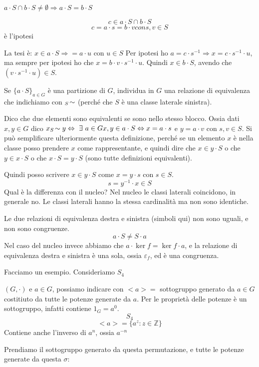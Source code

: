 $a \cdot S \cap b \cdot S \neq \emptyset \Rightarrow a \cdot S = b \cdot S$

\[
c \in a \cdot S \cap b \cdot S
\]
\[
c = a \cdot s = b \cdot v con s, v \in S
\]
\`e l'ipotesi

La tesi \`e:
$x \in a \cdot S \Rightarrow = a \cdot u$ con $u \in S$
Per ipotesi ho $a = c \cdot s^{-1} \Rightarrow x = c \cdot s^{-1} \cdot u$, ma sempre per ipotesi ho che $x = b \cdot v \cdot s^{-1} \cdot u$. Quindi $x \in b \cdot S$, avendo che $(v \cdot s^{-1} \cdot u) \in S$.

Se $\{a \cdot S\}_{a \in G}$ \`e una partizione di $G$, individua in $G$ una relazione di equivalenza che indichiamo con ${}_{S}\!\sim$ (perch\'e che $S$ \`e una classe laterale sinistra).

Dico che due elementi sono equivalenti se sono nello stesso blocco. Ossia dati $x, y \in G$ dico $x \lateralsx{S} y \Leftrightarrow \exists a \in G x, y \in a \cdot S \Leftrightarrow x = a \cdot s$ e $y = a \cdot v$ con $s, v \in S$. Si pu\`o semplificare ulteriormente questa definizione, perch\'e se un elemento $x$ \`e nella classe posso prendere $x$ come rappresentante, e quindi dire che $x \in y \cdot S$ o che $y \in x \cdot S$ o che $x \cdot S = y \cdot S$ (sono tutte definizioni equivalenti).

Quindi posso scrivere $x \in y \cdot S$ come $x = y \cdot s$ con $s \in S$.
\[
s = y^{-1} \cdot x \in S
\]
Qual \`e la differenza con il nucleo? Nel nucleo le classi laterali coincidono, in generale no. Le classi laterali hanno la stessa cardinalit\`a ma non sono identiche.

Le due relazioni di equivalenza destra e sinistra (simboli qui) non sono uguali, e non sono congruenze.
\[
a \cdot S \neq S \cdot a
\]
Nel caso del nucleo invece abbiamo che $a \cdot \ker f = \ker f \cdot a$, e la relazione di equivalenza destra e sinistra \`e una sola, ossia $\varepsilon_f$, ed \`e una congruenza.

Facciamo un esempio. Consideriamo $S_4$

$(G, \cdot)$ e $a \in G$, possiamo indicare con $< a > =$ sottogruppo generato da $a \in G$ costitiuto da tutte le potenze generate da $a$. Per le propriet\`a delle potenze \`e un sottogruppo, infatti contiene $1_G = a^{0}$.
\[
S_4
\]
\[
< a > = \{ a^{z} : z \in \mathbb{Z} \}
\]
Contiene anche l'inverso di $a^{n}$, ossia $a^{-n}$

Prendiamo il sottogruppo generato da questa permutazione, e tutte le potenze generate da questa $\sigma$:

